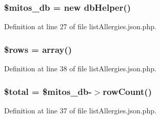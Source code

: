 \hypertarget{list_allergies_8json_8php_ab5d961f93efe4e2e8d8374f01dd6c65a}{
\subsubsection[{\$mitos\-\_\-db}]{\setlength{\rightskip}{0pt plus 5cm}\$mitos\-\_\-db = new {\bf db\-Helper}()}}\label{list_allergies_8json_8php_ab5d961f93efe4e2e8d8374f01dd6c65a}


\-Definition at line 27 of file list\-Allergies.\-json.\-php.

\hypertarget{list_allergies_8json_8php_ace2ec39e7df3899fa8df9640ec274b03}{
\subsubsection[{\$rows}]{\setlength{\rightskip}{0pt plus 5cm}\$rows = array()}}\label{list_allergies_8json_8php_ace2ec39e7df3899fa8df9640ec274b03}


\-Definition at line 38 of file list\-Allergies.\-json.\-php.

\hypertarget{list_allergies_8json_8php_a241b818f48030b628685b2e5119c5624}{
\subsubsection[{\$total}]{\setlength{\rightskip}{0pt plus 5cm}\$total = \$mitos\-\_\-db-\/$>$row\-Count()}}\label{list_allergies_8json_8php_a241b818f48030b628685b2e5119c5624}


\-Definition at line 37 of file list\-Allergies.\-json.\-php.

